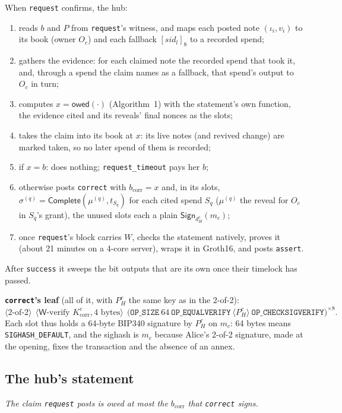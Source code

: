 \documentclass[11pt]{article}
\theoremstyle{plain}
\theoremstyle{definition}
\newcommand{\bcorr}{b_{\mathrm{corr}}}
\newcommand{\tx}[1]{\texttt{#1}}
\newcommand{\pre}[1]{[#1]_8}                         %
\newcommand{\Sign}{\mathsf{Sign}}
\newcommand{\Compl}{\mathsf{Complete}}
\newcommand{\Wots}{\mathsf{W}}
\newcommand{\sid}{\mathit{sid}}
\newcommand{\owed}{\mathsf{owed}}
\newcommand{\PH}{P_H^{c}}
\newcommand{\dH}{d_H^{c}}
\newcommand{\Oc}{O_c}
\begin{document}
When \tx{request} confirms, the hub:
\begin{enumerate}[nosep]
\item reads $b$ and $P$ from \tx{request}'s witness, and maps each posted
  note $(\iota_i, v_i)$ to its book (owner $\Oc$) and each fallback
  $\pre{\sid_l}$ to a recorded spend;
\item gathers the evidence: for each claimed note the recorded spend
  that took it, and, through a spend the claim names as a fallback, that
  spend's output to $\Oc$ in turn;
\item computes $x = \owed(\cdot)$ (Algorithm~1) with the
  statement's own function, the evidence cited and its reveals' final
  nonces as the slots;
\item takes the claim into its book at $x$: its live notes (and revived
  change) are marked taken, so no later spend of them is recorded;
\item if $x = b$: does nothing; \tx{request\_timeout} pays her $b$;
\item otherwise posts \tx{correct} with $\bcorr = x$ and, in its slots,
  $\sigma^{(q)} = \Compl(\mu^{(q)}, t_{S_q})$ for each cited spend $S_q$
  ($\mu^{(q)}$ the reveal for $\Oc$ in $S_q$'s grant), the unused slots
  each a plain $\Sign_{\dH}(m_c)$;
\item once \tx{request}'s block carries $W$, checks the statement
  natively, proves it (about 21 minutes on a 4-core server), wraps it
  in Groth16, and posts \tx{assert}.
\end{enumerate}
After \tx{success} it sweeps the bit outputs that are its own once
their timelock has passed.

\textbf{\tx{correct}'s leaf} (all of it, with $\PH$ the same key as in
the 2-of-2):
\[
  \langle\text{2-of-2}\rangle\ \ \langle\Wots\text{-verify } K_{\mathrm{corr}}^c,
  \text{4 bytes}\rangle\ \ \big(\tx{OP\_SIZE}\ 64\ \tx{OP\_EQUALVERIFY}\
  \langle \PH\rangle\ \tx{OP\_CHECKSIGVERIFY}\big)^{\times 8}.
\]
Each slot thus holds a 64-byte BIP340 signature by $\PH$ on $m_c$: 64
bytes means \tx{SIGHASH\_DEFAULT}, and the sighash is $m_c$ because
Alice's 2-of-2 signature, made at the opening, fixes the transaction and
the absence of an annex.

\subsection{The hub's statement}\label{sec:statement}

\emph{The claim \tx{request} posts is owed at most the $\bcorr$ that
\tx{correct} signs.}
\end{document}
